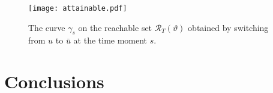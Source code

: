 \documentclass[sn-mathphys-num]{sn-jnl}
\numberwithin{equation}{section}
\theoremstyle{mythm}
\theoremstyle{mydef}
\newtheorem{definition}[proposition]{Definition}
\renewcommand{\d}{\,d}
\begin{document}
\begin{figure}
  \centering
  \texttt{[image: attainable.pdf]}
  \caption{The curve \( \gamma_s \) on the reachable set \( \mathcal{R}_T(\vartheta) \) obtained by switching from \( u \) to \( \bar{u} \) at the time moment \( s \).}
  \label{fig:attainable}
\end{figure}





\section{Conclusions}\label{sec:concl}
\end{document}
